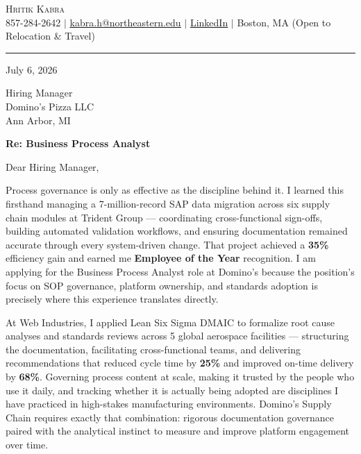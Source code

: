 \documentclass[letterpaper,10pt]{article}
\begin{document}
\begin{center}
    {\LARGE \scshape \color{heading} Hritik Kabra} \\ \vspace{2pt}
    857-284-2642 $|$
    \href{mailto:kabra.h@northeastern.edu}{\underline{kabra.h@northeastern.edu}} $|$
    \href{https://www.linkedin.com/in/hritikkabra888}{\underline{LinkedIn}} $|$
    Boston, MA (Open to Relocation \& Travel)
\end{center}

{\color{heading}\hrule}
\vspace{14pt}

July 6, 2026

\vspace{4pt}

Hiring Manager \\
Domino's Pizza LLC \\
Ann Arbor, MI

\vspace{4pt}

\textbf{Re: Business Process Analyst}

\vspace{2pt}

Dear Hiring Manager,

Process governance is only as effective as the discipline behind it. I learned this firsthand managing a 7-million-record SAP data migration across six supply chain modules at Trident Group — coordinating cross-functional sign-offs, building automated validation workflows, and ensuring documentation remained accurate through every system-driven change. That project achieved a \textbf{35\%} efficiency gain and earned me \textbf{Employee of the Year} recognition. I am applying for the Business Process Analyst role at Domino's because the position's focus on SOP governance, platform ownership, and standards adoption is precisely where this experience translates directly.

At Web Industries, I applied Lean Six Sigma DMAIC to formalize root cause analyses and standards reviews across 5 global aerospace facilities — structuring the documentation, facilitating cross-functional teams, and delivering recommendations that reduced cycle time by \textbf{25\%} and improved on-time delivery by \textbf{68\%}. Governing process content at scale, making it trusted by the people who use it daily, and tracking whether it is actually being adopted are disciplines I have practiced in high-stakes manufacturing environments. Domino's Supply Chain requires exactly that combination: rigorous documentation governance paired with the analytical instinct to measure and improve platform engagement over time.
\end{document}
